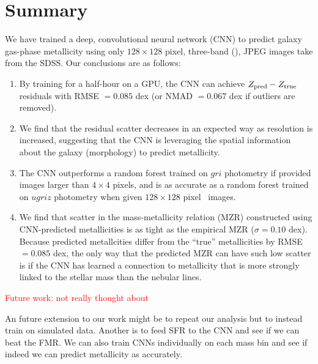 \documentclass[fleqn,usenatbib]{mnras}
\newcommand{\editorial}[1]{\textcolor{red}{#1}}
\begin{document}
\section{Summary}\label{sec:summary}
We have trained a deep, convolutional neural network (CNN) to predict galaxy gas-phase metallicity using only $128 \times 128$ pixel, three-band (\sdssi\sdssr\sdssg), JPEG images take from the SDSS.
Our conclusions are as follows:
\begin{enumerate}
	\item By training for a half-hour on a GPU, the CNN can achieve $Z_{\rm pred} - Z_{\rm true}$ residuals with RMSE $= 0.085$ dex (or NMAD $= 0.067$ dex if outliers are removed).

	\item We find that the residual scatter decreases in an expected way as resolution is increased, suggesting that the CNN is leveraging the spatial information about the galaxy (morphology) to predict metallicity.

	\item The CNN outperforms a random forest trained on $gri$ photometry if provided images larger than $4\times 4$ pixels, and is as accurate as a random forest trained on $ugriz$ photometry when given $128 \times 128$ pixel \sdssi\sdssr\sdssg\ images.

	\item We find that scatter in the mass-metallicity relation (MZR) constructed using CNN-predicted metallicities is as tight as the empirical MZR ($\sigma = 0.10$ dex).	Because predicted metallcities differ from the ``true'' metallicities by RMSE $= 0.085$ dex, the only way that the predicted MZR can have such low scatter is if the CNN has learned a connection to metallicity that is more strongly linked to the stellar mass than the nebular lines.
\end{enumerate}

\editorial{Future work:}
\editorial{not really thought about}

An future extension to our work might be to repeat our analysis but to instead train on simulated data.
Another is to feed SFR to the CNN and see if we can beat the FMR.
We can also train CNNs individually on each mass bin and see if indeed we can predict metallicity as accurately.
\end{document}
